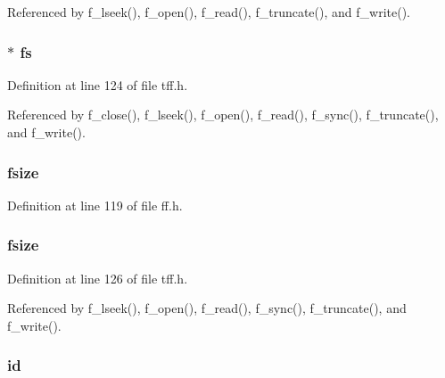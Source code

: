 Referenced by f\-\_\-lseek(), f\-\_\-open(), f\-\_\-read(), f\-\_\-truncate(), and f\-\_\-write().

\hypertarget{struct_f_i_l_a472e3612956e3ffb3ab823c37ca33250}{
\subsubsection[{fs}]{ $\ast$ fs}}\label{struct_f_i_l_a472e3612956e3ffb3ab823c37ca33250}


Definition at line 124 of file tff.\-h.



Referenced by f\-\_\-close(), f\-\_\-lseek(), f\-\_\-open(), f\-\_\-read(), f\-\_\-sync(), f\-\_\-truncate(), and f\-\_\-write().

\hypertarget{struct_f_i_l_af70a0afd16367837984d6205cbfca308}{
\subsubsection[{fsize}]{ fsize}}\label{struct_f_i_l_af70a0afd16367837984d6205cbfca308}


Definition at line 119 of file ff.\-h.

\hypertarget{struct_f_i_l_a7582a0b3a658c0543f6cdc7585d84f7c}{
\subsubsection[{fsize}]{ fsize}}\label{struct_f_i_l_a7582a0b3a658c0543f6cdc7585d84f7c}


Definition at line 126 of file tff.\-h.



Referenced by f\-\_\-lseek(), f\-\_\-open(), f\-\_\-read(), f\-\_\-sync(), f\-\_\-truncate(), and f\-\_\-write().

\hypertarget{struct_f_i_l_a7b7a6396b2c82ad46c6d8b2bf141a8dd}{
\subsubsection[{id}]{ id}}\label{struct_f_i_l_a7b7a6396b2c82ad46c6d8b2bf141a8dd}


